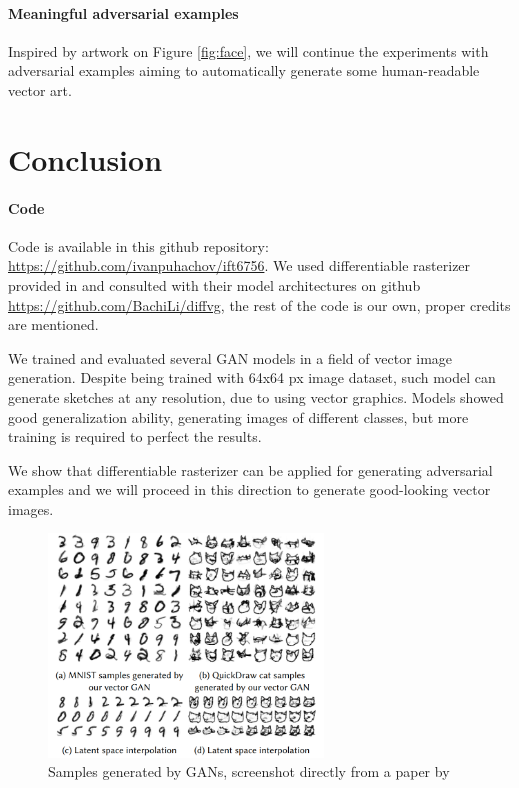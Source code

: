 \documentclass{article}
\begin{document}
\paragraph{Meaningful adversarial examples} Inspired by artwork on Figure \ref{fig:face}, we will continue the experiments with adversarial examples aiming to automatically generate some human-readable vector art.


\section{Conclusion}

\paragraph{Code} Code is available in this github repository: \url{https://github.com/ivanpuhachov/ift6756}. We used differentiable rasterizer provided in \cite{diffsvg} and consulted with their model architectures on github \url{https://github.com/BachiLi/diffvg}, the rest of the code is our own, proper credits are mentioned.

We trained and evaluated several GAN models in a field of vector image generation. Despite being trained with 64x64 px image dataset, such model can generate sketches at any resolution, due to using vector graphics. Models showed good generalization ability, generating images of different classes, but more training is required to perfect the results. 

We show that differentiable rasterizer can be applied for generating adversarial examples and we will proceed in this direction to generate good-looking vector images.


	
	
	
	
	\begin{figure}[h]
		\centering
		\includegraphics[width=0.65\textwidth]{img/diffsvg.png}
		\caption{Samples generated by GANs, screenshot directly from a paper by \cite{diffsvg}}
		\label{fig:diffsvg}
	\end{figure}
	
\end{document}
